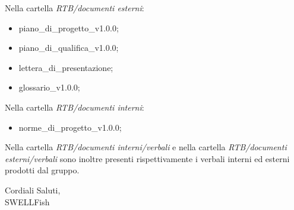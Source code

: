 \documentclass[12pt]{article}
\begin{document}
Nella cartella \textit{RTB/documenti esterni}:
\begin{itemize}
\item piano\_di\_progetto\_v1.0.0;
\item piano\_di\_qualifica\_v1.0.0;
\item lettera\_di\_presentazione;
\item glossario\_v1.0.0;
\end{itemize}
Nella cartella \textit{RTB/documenti interni}:
\begin{itemize}
    \item norme\_di\_progetto\_v1.0.0;
\end{itemize}
 Nella cartella \textit{RTB/documenti interni/verbali} e nella cartella \textit{ RTB/documenti
esterni/verbali} sono inoltre presenti rispettivamente i verbali interni ed esterni prodotti dal gruppo. 

\begin{flushright}
Cordiali Saluti,\\
SWELLFish
\end{flushright}
\end{document}
